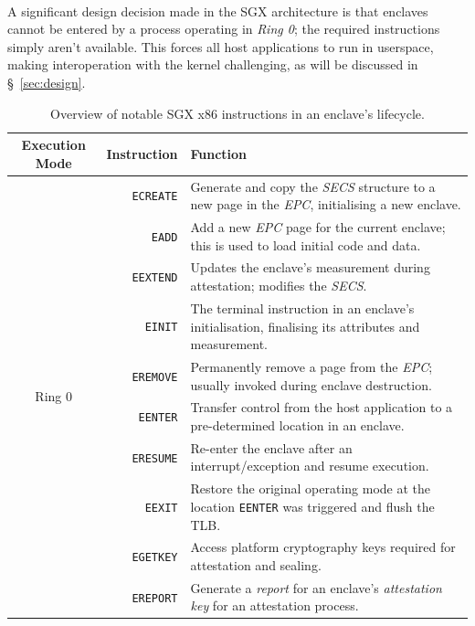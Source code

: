 \paragraph{} \label{sec:sgx-no-kernel-mode} A significant design decision made in the SGX architecture is that enclaves cannot be entered by a process operating in \textit{Ring 0}; the required instructions simply aren't available. This forces all host applications to run in userspace, making interoperation with the kernel challenging, as will be discussed in §~\ref{sec:design}.

\begin{table}
    \centering
    \newcommand\tableTop{\rule{0pt}{3ex}}
    \newcommand\tableMid{\rule{0pt}{3ex}}
    \newcommand\tableBottom{\rule[-2ex]{0pt}{0pt}}
    \begin{tabular}{|c|r|p{8.5cm}|} 
        \hline
        Execution Mode & Instruction & Function \\ [0.1ex] 
        \hline\hline
        \multirow{11}{*}{Ring 0} 
            & \tableTop{\texttt{ECREATE}} & \tableTop{Generate and copy the \textit{SECS} structure to a new page in the \textit{EPC}, initialising a new enclave.} \\ 
            & \texttt{EADD} & \tableMid{Add a new \textit{EPC} page for the current enclave; this is used to load initial code and data.} \\ 
            & \texttt{EEXTEND} & \tableMid{Updates the enclave's measurement during attestation; modifies the \textit{SECS}.} \\ 
            & \texttt{EINIT} & \tableMid{The terminal instruction in an enclave's initialisation, finalising its attributes and measurement.} \\ 
            & \texttt{EREMOVE} & \tableMid{Permanently remove a page from the \textit{EPC}; usually invoked during enclave destruction.} \tableBottom \\ 
        \hline\hline
        \multirow{11}{*}{Ring 3} 
        & \tableTop{\texttt{EENTER}} & \tableTop{Transfer control from the host application to a pre-determined location in an enclave.} \\ 
        & \texttt{ERESUME} & \tableMid{Re-enter the enclave after an interrupt/exception and resume execution.} \\ 
        & \texttt{EEXIT} & \tableMid{Restore the original operating mode at the location \texttt{EENTER} was triggered and flush the TLB.} \\ 
        & \texttt{EGETKEY} & \tableMid{Access platform cryptography keys required for attestation and sealing.} \\ 
        & \texttt{EREPORT} & \tableMid{Generate a \textit{report} for an enclave's \textit{attestation key} for an attestation process.} \tableBottom \\ 
        \hline
    \end{tabular}
    \vspace{5mm}
    \caption{Overview of notable SGX x86 instructions in an enclave's lifecycle.}
    \label{table:sgx-instructions}
\end{table}



